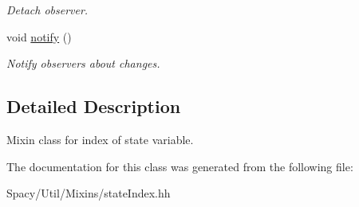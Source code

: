 \begin{DoxyCompactItemize}
\begin{DoxyCompactList}\small\item\em Detach observer. \end{DoxyCompactList}\item 
\hypertarget{classSpacy_1_1Mixin_1_1MixinConnection_a1ddeaa78a3bb4a38c2cca36d1f99fe36}{}void \hyperlink{classSpacy_1_1Mixin_1_1MixinConnection_a1ddeaa78a3bb4a38c2cca36d1f99fe36}{notify} ()\label{classSpacy_1_1Mixin_1_1MixinConnection_a1ddeaa78a3bb4a38c2cca36d1f99fe36}

\begin{DoxyCompactList}\small\item\em Notify observers about changes. \end{DoxyCompactList}\end{DoxyCompactItemize}


\subsection{Detailed Description}
Mixin class for index of state variable. 

The documentation for this class was generated from the following file\+:\begin{DoxyCompactItemize}
\item 
Spacy/\+Util/\+Mixins/state\+Index.\+hh\end{DoxyCompactItemize}

